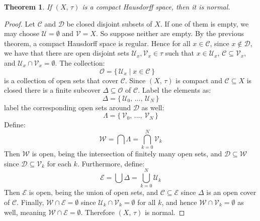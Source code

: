 \documentclass{article}
\theoremstyle{plain}
\newtheorem{theorem}{Theorem}[section]
\theoremstyle{normal}
\begin{document}
        \begin{theorem}
            If $(X,\,\tau)$ is a compact Hausdorff space, then it is normal.
        \end{theorem}
        \begin{proof}
            Let $\mathcal{C}$ and $\mathcal{D}$ be closed disjoint subsets of
            $X$. If one of them is empty, we may choose $\mathcal{U}=\emptyset$
            and $\mathcal{V}=X$. So suppose neither are empty. By the previous
            theorem, a compact Hausdorff space is regular. Hence for all
            $x\in\mathcal{C}$, since $x\notin\mathcal{D}$, we have that there
            are open disjoint sets $\mathcal{U}_{x},\mathcal{V}_{x}\in\tau$
            such that $x\in\mathcal{U}_{x}$,
            $\mathcal{C}\subseteq\mathcal{V}_{x}$, and
            $\mathcal{U}_{x}\cap\mathcal{V}_{x}=\emptyset$. The collection:
            \begin{equation}
                \mathcal{O}
                    =\{\,\mathcal{U}_{x}\;|\;x\in\mathcal{C}\,\}\quad
            \end{equation}
            is a collection of open sets that cover $\mathcal{C}$. Since
            $(X,\,\tau)$ is compact and $\mathcal{C}\subseteq{X}$ is closed
            there is a finite subcover $\Delta\subseteq\mathcal{O}$ of
            $\mathcal{C}$. Label the elements as:
            \begin{equation}
                \Delta=\{\,\mathcal{U}_{0},\,\dots,\,\mathcal{U}_{N}\,\}
            \end{equation}
            label the corresponding open sets around $\mathcal{D}$ as well:
            \begin{equation}
                \Lambda=\{\,\mathcal{V}_{0},\,\dots,\,\mathcal{V}_{N}\,\}
            \end{equation}
            Define:
            \begin{equation}
                \mathcal{W}=\bigcap\Lambda=\bigcap_{k=0}^{N}\mathcal{V}_{k}
            \end{equation}
            Then $\mathcal{W}$ is open, being the intersection of finitely
            many open sets, and $\mathcal{D}\subseteq\mathcal{W}$ since
            $\mathcal{D}\subseteq\mathcal{V}_{k}$ for each $k$.
            Furthermore, define:
            \begin{equation}
                \mathcal{E}=\bigcup\Delta=\bigcup_{k=0}^{N}\mathcal{U}_{k}
            \end{equation}
            Then $\mathcal{E}$ is open, being the union of open sets, and
            $\mathcal{C}\subseteq\mathcal{E}$ since $\Delta$ is an open cover
            of $\mathcal{C}$. Finally,
            $\mathcal{W}\cap\mathcal{E}=\emptyset$ since
            $\mathcal{U}_{k}\cap\mathcal{V}_{k}=\emptyset$ for all $k$, and
            hence $\mathcal{W}\cap\mathcal{V}_{k}=\emptyset$ as well, meaning
            $\mathcal{W}\cap\mathcal{E}=\emptyset$. Therefore $(X,\,\tau)$
            is normal.
        \end{proof}
\end{document}
